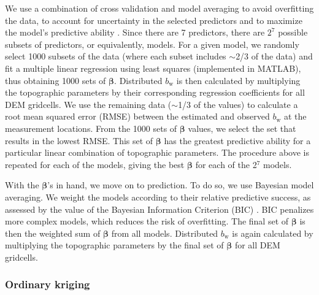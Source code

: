 \documentclass[review,oneside, letterpaper]{igs}
\renewcommand{\vector}[1]{\mathbf{#1}}
\begin{document}
%
We use a combination of cross validation and model averaging to avoid overfitting the data, to account for uncertainty in the selected predictors and to maximize the model's predictive ability \citep{Madigan1994,Kohavi1995}.  Since there are 7 predictors, there are $2^7$ possible subsets of predictors, or equivalently, models.
%
For a given model, we randomly select 1000 subsets of the data (where each subset includes $\sim$2/3 of the data) and fit a multiple linear regression using least squares (implemented in MATLAB), thus obtaining 1000 sets of $\vector{\beta}$. 
Distributed $b_\mathrm{w}$ is then calculated by multiplying the topographic parameters by their corresponding regression coefficients for all DEM gridcells. 
We use the remaining data ($\sim$1/3 of the values) to calculate a root mean squared error (RMSE) between the estimated and  observed $b_\mathrm{w}$ at the measurement locations. From the 1000 sets of $\vector{\beta}$ values, we select the set that results in the lowest RMSE. This set of $\vector{\beta}$ has the greatest predictive ability for a particular linear combination of topographic parameters. 
The procedure above is repeated for each of the models, giving the best $\vector{\beta}$ for each of the 2$^7$ models.

With the $\vector{\beta}$'s in hand, we move on to prediction.  To do so, we use Bayesian model averaging. 
We weight the models according to their relative predictive success, as assessed by the value of the Bayesian Information Criterion (BIC)   \citep{Burnham2004}. 
BIC penalizes more complex models, which reduces the risk of overfitting. The final set of $\vector{\beta}$ is then the weighted sum of $\vector{\beta}$ from all models. 
Distributed $b_\mathrm{w}$ is again calculated by multiplying the topographic parameters by the final set of $\vector{\beta}$ for all DEM gridcells.

\subsubsection{Ordinary kriging}
\end{document}
